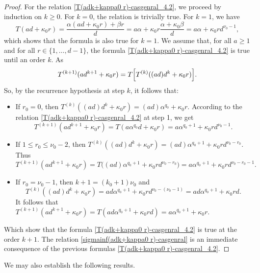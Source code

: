 \documentclass[11pt,a4paper]{article}
\begin{document}
\begin{proof}
	For the relation \eqref{T(adk+kappa0 r)-casgenral_4.2}, we proceed by induction on $k\geq 0$. For $k=0$, the relation is trivially true. For $k=1$, we have 
	\begin{equation}\label{recurencek=1} 
		T(ad+\kappa_0 r)=\dfrac{\alpha(ad+\kappa_0 r)+\beta r}{d}=a \alpha +\kappa_0 r \dfrac{\alpha +\kappa_0\beta }{d}=a \alpha +\kappa_0 r d^{\nu_0-1},
	\end{equation}
	which shows that the formula is also true for $k=1$. We assume that, for all $a\geq 1$  and for all $r\in\{1,\ldots,d-1\}$,
	the formula \eqref{T(adk+kappa0 r)-casgenral_4.2}  is true until an order $k$.   As
	$$T^{(k+1)}(ad^{k+1}+\kappa_0 r)=T\Bigl[T^{(k)}((ad)d^{k}+\kappa_0 r)\Bigr].$$
	So,  by  the recurrence hypothesis at step $k$, it follows that:
	\begin{itemize}
		\item [-] If  $r_0=0$,  then 
		$T^{(k)}((ad)d^{k}+\kappa_0 r)=(ad)\alpha^{q_0}+\kappa_0 r$. According to the relation \eqref{T(adk+kappa0 r)-casgenral_4.2} at step 1, we get
		$$T^{(k+1)}(ad^{k+1}+\kappa_0 r)=T(a \alpha^{q_0} d+\kappa_0 r )=a \alpha^{q_0+1}+\kappa_0 rd^{\nu_0-1}.$$
		\item [-] If  $1\leq r_0\leq \nu_0-2$,  then 
		$T^{(k)}((ad)d^{k}+\kappa_0 r)=(ad)\alpha^{q_0+1}+\kappa_0 rd^{\nu_0-r_0}$. Thus
		$$T^{(k+1)}(ad^{k+1}+\kappa_0 r)=T\bigl((ad)\alpha^{q_0+1}+\kappa_0 rd^{\nu_0-r_0} \bigr)=a\alpha^{q_0+1}+\kappa_0 rd^{\nu_0-r_0-1}.$$
		\item [-] If  $ r_0=\nu_0-1$, then $k+1= (k_0+1)\nu_0$ and
		$$T^{(k)}((ad)d^{k}+\kappa_0 r)=ad\alpha^{q_0+1} +\kappa_0 r d^{\nu_0-(\nu_0-1)}=ad\alpha^{q_0+1} +\kappa_0 r d
		.$$
		It follows that
		$T^{(k+1)}(ad^{k+1}+\kappa_0 r)=T(ad\alpha^{q_0+1} +\kappa_0 r d )=a\alpha^{q_0+1} +\kappa_0 r .$
	\end{itemize}
	Which show that the formula \eqref{T(adk+kappa0 r)-casgenral_4.2}  is true at the order $k+1$. The relation  \eqref{sigmainf(adk+kappa0 r)-casgenral}    is an immediate consequence of the previous formulas  \eqref{T(adk+kappa0 r)-casgenral_4.2}.
	\hfill\end{proof}




We may also establish the following results.
\end{document}
